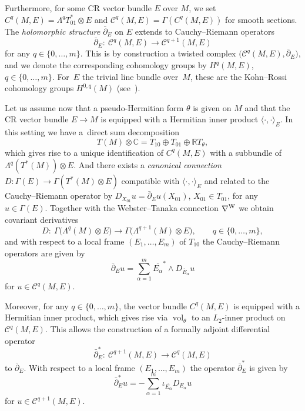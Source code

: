 \documentclass[10pt,a4paper]{amsart}
\numberwithin{equation}{section}
\newcommand{\RR}{\mathbb{R}}
\newcommand{\CC}{\mathbb{C}}
\begin{document}
Furthermore, for some CR vector bundle $E$ over $M$, we set $C^q(M,E)=\Lambda^qT_{01}^*\otimes E$ and
$\mathcal{C}^q(M,E)=\Gamma(C^q(M,E))$ for smooth sections. The {\em holomorphic structure} $\bar{\partial}_E$ on $E$ extends to Cauchy--Riemann operators
\[ \bar{\partial}_E\colon \ \mathcal{C}^q(M,E) \to \mathcal{C}^{q+1}(M,E)\]
for any $q\in\{0,\dots,m\}$. This is by construction a twisted complex $\big( \mathcal{C}^q(M,E), \bar{\partial}_E\big)$, and
we denote the corresponding cohomology groups by $H^q(M,E)$, $q\in\{0,\dots,m\}$.
For~$E$ the trivial line bundle over~$M$, these are the Kohn--Rossi cohomology groups $H^{0,q}(M)$ (see~\cite{Tan}).

Let us assume now that a pseudo-Hermitian form $\theta$ is given on $M$ and
that the CR vector bundle $E\to M$ is equipped with a Hermitian inner product
$\langle\cdot,\cdot\rangle_E$. In this setting we have a~direct sum decomposition
\[
T(M)\otimes\CC = T_{10}\oplus T_{01}\oplus \RR T_\theta,
\]
which gives rise to a unique identification of $C^q(M,E)$ with a subbundle of $\Lambda^q(T^*(M))\otimes E$.
And there exists
a {\em canonical connection} $D\colon \Gamma(E)\to\Gamma(T^*(M)\otimes E)$ compatible with $\langle\cdot,\cdot\rangle_E$
and related to the Cauchy--Riemann operator by $D_{X_{01}}u=\bar{\partial}_Eu(X_{01})$, $X_{01}\in T_{01}$,
for any $u\in\Gamma(E)$.
Together with the Webster--Tanaka connection $\nabla^{\rm W}$ we obtain covariant derivatives
\[
D\colon \ \Gamma\big(\Lambda^q(M)\otimes E\big) \to \Gamma\big(\Lambda^{q+1}(M)\otimes E\big),\qquad q\in\{0,\dots,m\},
\]
and  with respect to a local frame $(E_1,\dots,E_m)$ of $T_{10}$ the Cauchy--Riemann operators are given by
\[
\bar{\partial}_Eu = \sum_{\alpha=1}^m \overline{E_\alpha}^*\wedge D_{\overline{E}_\alpha}u
\]
for $u\in\mathcal{C}^q(M,E)$.

Moreover, for any $q\in\{0,\dots,m\}$, the vector bundle $C^q(M,E)$ is equipped with a Hermitian inner product,
which gives rise via $\operatorname{vol}_\theta$ to an $L_2$-inner product on $\mathcal{C}^q(M,E)$.
This allows the construction of a formally adjoint differential operator
\[
\bar{\partial}^*_E\colon \ \mathcal{C}^{q+1}(M,E) \to \mathcal{C}^{q}(M,E)
\]
to $\bar{\partial}_E$.
With respect to a local frame $(E_1,\dots,E_m)$ the operator $\bar{\partial}^*_E$ is given by
\[
\bar{\partial}^*_Eu = -\sum_{\alpha=1}^m \iota_{\overline{E_\alpha}} D_{E_\alpha}u
\]
for $u\in\mathcal{C}^{q+1}(M,E)$.
\end{document}
